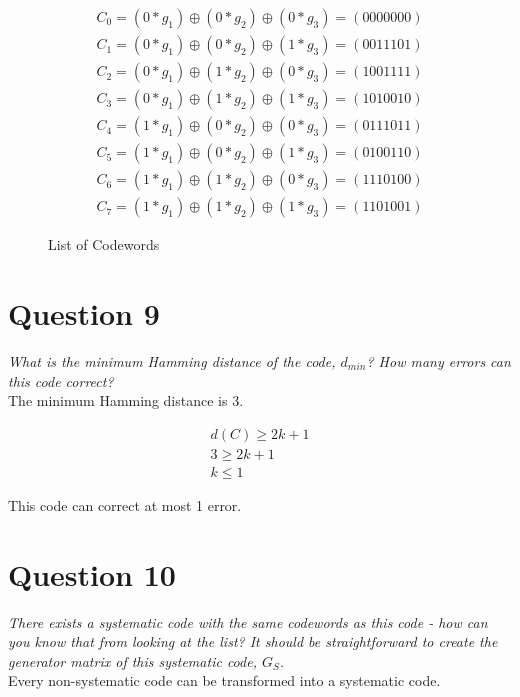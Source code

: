 \documentclass[12pt]{report}
\begin{document}
\newcommand{\genCW}[3]{(#1*g_1) \oplus (#2*g_2) \oplus (#3*g_3)}

\begin{figure}[H]
    \begin{gather*}
        C_0 = \genCW{0}{0}{0} = (0000000) \\
        C_1 = \genCW{0}{0}{1} = (0011101) \\
    	C_2 = \genCW{0}{1}{0} = (1001111) \\
    	C_3 = \genCW{0}{1}{1} = (1010010) \\
    	C_4 = \genCW{1}{0}{0} = (0111011) \\
    	C_5 = \genCW{1}{0}{1} = (0100110) \\
    	C_6 = \genCW{1}{1}{0} = (1110100) \\
    	C_7 = \genCW{1}{1}{1} = (1101001)
    \end{gather*}
    \caption{List of Codewords}
\end{figure}

\section*{Question 9}
\textit{What is the minimum Hamming distance of the code, $d_{min}$? How many errors can this code
correct?} \\

\noindent The minimum Hamming distance is 3. 

\begin{gather}
    d(C) \geq 2k + 1 \\
    3 \geq 2k + 1 \\
    k \leq 1
\end{gather}

\noindent This code can correct at most 1 error.

\newpage

\section*{Question 10}
\textit{There exists a systematic code with the same codewords as this code - how can you know
that from looking at the list? It should be straightforward to create the generator matrix of
this systematic code, $G_S$.} \\

\noindent Every non-systematic code can be transformed into a systematic code. 
\end{document}
